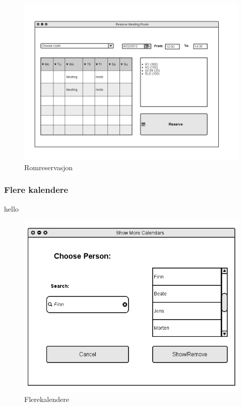 \begin{figure}[H]
\centering
\includegraphics[scale=0.65]{images/romreservasjon.png}
\caption{Romreservasjon}
\label{romreservasjon_image}
\end{figure}

\subsubsection{Flere kalendere}
hello

\begin{figure}[H]
\centering
\includegraphics[scale=0.5]{images/flerekalendere.png}
\caption{Flerekalendere}
\label{flerekalendere_image}
\end{figure}

